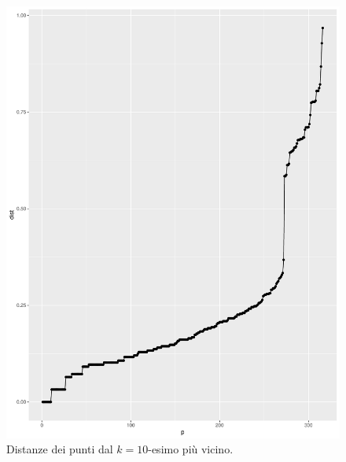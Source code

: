 \documentclass[12pt]{article}
\begin{document}
\begin{figure}[H]
\centering
	\includegraphics[width=\textwidth]{img/eps-minpts10.pdf}
	\caption{Distanze dei punti dal $k=10$-esimo più vicino.}
	\label{fig:eps-minpts10}
\end{figure}
\end{document}
